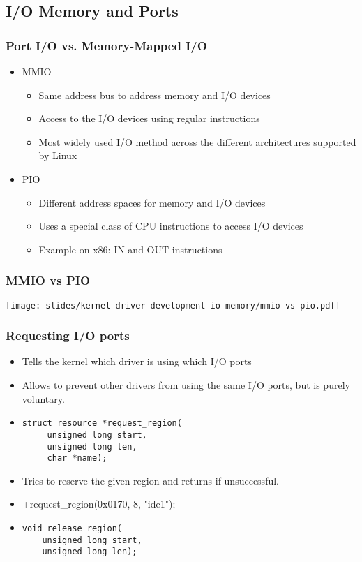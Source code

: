 \subsection{I/O Memory and Ports}

\begin{frame}
  \frametitle{Port I/O vs. Memory-Mapped I/O}
  \begin{itemize}
  \item MMIO
    \begin{itemize}
    \item Same address bus to address memory and I/O devices
    \item Access to the I/O devices using regular instructions
    \item Most widely used I/O method across the different
      architectures supported by Linux
    \end{itemize}
  \item PIO
    \begin{itemize}
    \item Different address spaces for memory and I/O devices
    \item Uses a special class of CPU instructions to access I/O
      devices
    \item Example on x86: IN and OUT instructions
    \end{itemize}
  \end{itemize}
\end{frame}

\begin{frame}
  \frametitle{MMIO vs PIO}
  \begin{center}
    \texttt{[image: slides/kernel-driver-development-io-memory/mmio-vs-pio.pdf]}
  \end{center}
\end{frame}

\begin{frame}[fragile]
  \frametitle{Requesting I/O ports}
  \begin{itemize}
  \item Tells the kernel which driver is using which I/O ports
  \item Allows to prevent other drivers from using the same I/O ports,
    but is purely voluntary.
  \item
\begin{verbatim}
struct resource *request_region(
     unsigned long start,
     unsigned long len,
     char *name);
\end{verbatim}
  \item Tries to reserve the given region and returns  if unsuccessful.
  \item {}+request_region(0x0170, 8, "ide1");+
  \item
\begin{verbatim}
void release_region(
    unsigned long start,
    unsigned long len);
\end{verbatim}
\end{itemize}
\end{frame}

